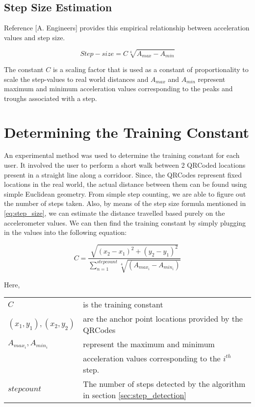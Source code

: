 \subsection{Step Size Estimation}

Reference [A. Engineers] provides this empirical relationship between acceleration
values and step size.

\begin{equation}\label{eq:step_size}
 Step-size = C \sqrt[4]{A_{max} - A_{min}}
\end{equation}

The constant $C$ is a scaling factor that is used as a constant of proportionality
to scale the step-values to real world distances and $A_{max}$ and $A_{min}$
represent maximum and minimum acceleration values corresponding to the 
peaks and troughs associated with a step.


\section{Determining the Training Constant}

An experimental method was used to determine the training constant for each
user. It involved the user to perform a short walk between 2 QRCoded locations
present in a straight line along a corridoor.
Since, the QRCodes represent fixed locations in the real world, the actual 
distance between them can be found using simple Euclidean geometry. From 
simple step counting, we are able to figure out the number of steps taken.
Also, by means of the step size formula mentioned in \eqref{eq:step_size},
we can estimate the distance travelled based purely on the accelerometer
values. We can then find the training constant by simply plugging in 
the values into the following equation:

\begin{equation}
C=\frac{\sqrt{(x_{2}-x_{1})^{2}+(y_{2}-y_{1})^{2}}}{\sum_{n=1}^{stepcount}\sqrt[4]{(A_{max_{i}}-A_{min_{i}})}}
\end{equation}

Here,\\
\begin{tabular}{l l}
$C$                         & is the training constant   \\
$(x_1, y_1), (x_2, y_2)$    & are the anchor point locations provided by the QRCodes \\
$A_{max_{i}}, A_{min_{i}}$  & represent the maximum and minimum \\
                            & acceleration values corresponding to the $i^{th}$ step.\\
$stepcount$                 & The number of steps detected by the algorithm in section \ref{sec:step_detection} \\
\end{tabular}


